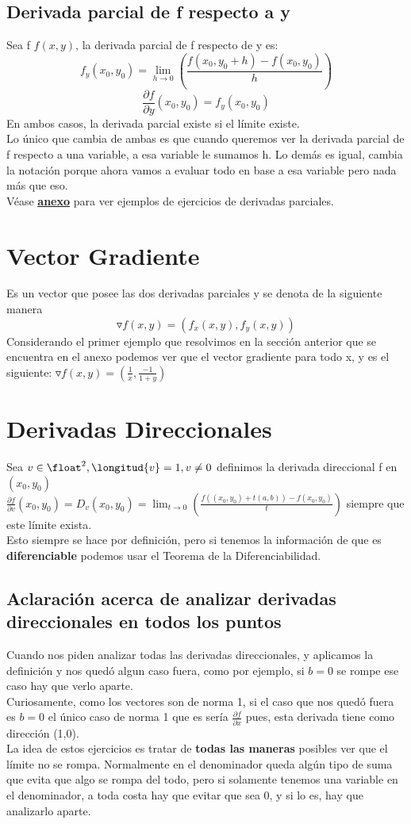 \documentclass[10pt,a4paper]{article}
\begin{document}
\subsection*{Derivada parcial de f respecto a y}
Sea f $f(x,y)$, la derivada parcial de f respecto de y es: 
\[f_{y}(x_{0}, y_{0}) = \lim_{h \to 0} \left(\frac{f(x_{0}, y_{0} + h) - f(x_{0}, y_{0})}{h} \right)\]
\[\frac{\partial f}{\partial y}(x_{0}, y_{0}) = f_{y}(x_{0}, y_{0})\]
En ambos casos, la derivada parcial existe si el límite existe. \\
Lo único que cambia de ambas es que cuando queremos ver la derivada parcial de f respecto a una variable, a esa variable le sumamos h. Lo demás es igual, cambia la notación porque ahora vamos a evaluar todo en base a esa variable pero nada más que eso. \\
Véase \hyperref[subsec:derivadas_parciales]{\underline{\textbf{anexo}}} para ver ejemplos de ejercicios de derivadas parciales.
\section*{Vector Gradiente}
Es un vector que posee las dos derivadas parciales y se denota de la siguiente manera
\[\triangledown f(x,y) = (f_{x}(x,y), f_{y}(x,y))\]
Considerando el primer ejemplo que resolvimos en la sección anterior que se encuentra en el anexo podemos ver que el vector gradiente para todo x, y es el siguiente: $\triangledown f(x, y) = (\frac{1}{x}, \frac{-1}{1+y})$
\section*{Derivadas Direccionales}
Sea $v \in \float^{2}, \longitud{v} = 1, v \neq 0$ definimos la derivada direccional f en $(x_{0}, y_{0})$ \\ 
$\frac{\partial f}{\partial v}(x_{0}, y_{0}) = D_{v}(x_{0}, y_{0}) = \lim_{t \to 0} \left(\frac{f((x_{0}, y_{0}) + t(a, b)) - f(x_{0}, y_{0})}{t} \right) $ siempre que este límite exista. \\
Esto siempre se hace por definición, pero si tenemos la información de que es \textbf{diferenciable} podemos usar el Teorema de la Diferenciabilidad. 
\subsection*{Aclaración acerca de analizar derivadas direccionales en \textbf{todos} los puntos}
Cuando nos piden analizar todas las derivadas direccionales, y aplicamos la definición y nos quedó algun caso fuera, como por ejemplo, si $b = 0$ se rompe ese caso hay que verlo aparte. \\
Curiosamente, como los vectores son de norma 1, si el caso que nos quedó fuera es $b=0$ el único caso de norma 1 que es sería $\frac{\partial f}{\partial x}$ pues, esta derivada tiene como dirección (1,0). \\
La idea de estos ejercicios es tratar de \textbf{todas las maneras} posibles ver que el límite no se rompa. Normalmente en el denominador queda algún tipo de suma que evita que algo se rompa del todo, pero si solamente tenemos una variable en el denominador, a toda costa hay que evitar que sea 0, y si lo es, hay que analizarlo aparte. 
\end{document}
